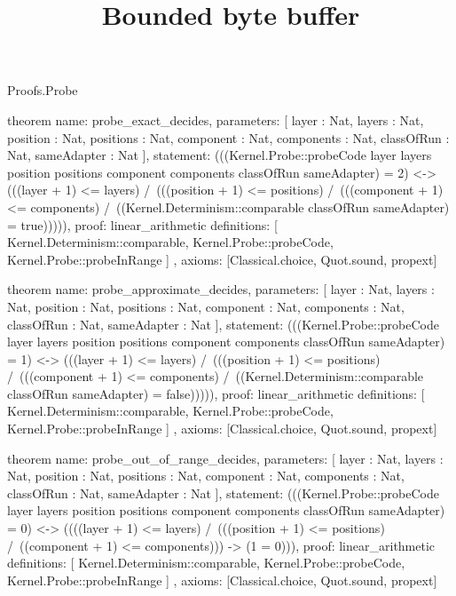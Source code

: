 \begin{lexlean}{Proofs.Probe}
\title{Bounded byte buffer}
\begin{semanticmodule}
theorem{
  name: probe_exact_decides,
  parameters: [
    layer : Nat,
    layers : Nat,
    position : Nat,
    positions : Nat,
    component : Nat,
    components : Nat,
    classOfRun : Nat,
    sameAdapter : Nat
  ],
  statement: (((Kernel.Probe::probeCode layer layers position positions component components classOfRun sameAdapter) = 2) <-> (((layer + 1) <= layers) /\ (((position + 1) <= positions) /\ (((component + 1) <= components) /\ ((Kernel.Determinism::comparable classOfRun sameAdapter) = true))))),
  proof: linear_arithmetic{
    definitions: [
      Kernel.Determinism::comparable,
      Kernel.Probe::probeCode,
      Kernel.Probe::probeInRange
    ]
  },
  axioms: [Classical.choice, Quot.sound, propext]
}

theorem{
  name: probe_approximate_decides,
  parameters: [
    layer : Nat,
    layers : Nat,
    position : Nat,
    positions : Nat,
    component : Nat,
    components : Nat,
    classOfRun : Nat,
    sameAdapter : Nat
  ],
  statement: (((Kernel.Probe::probeCode layer layers position positions component components classOfRun sameAdapter) = 1) <-> (((layer + 1) <= layers) /\ (((position + 1) <= positions) /\ (((component + 1) <= components) /\ ((Kernel.Determinism::comparable classOfRun sameAdapter) = false))))),
  proof: linear_arithmetic{
    definitions: [
      Kernel.Determinism::comparable,
      Kernel.Probe::probeCode,
      Kernel.Probe::probeInRange
    ]
  },
  axioms: [Classical.choice, Quot.sound, propext]
}

theorem{
  name: probe_out_of_range_decides,
  parameters: [
    layer : Nat,
    layers : Nat,
    position : Nat,
    positions : Nat,
    component : Nat,
    components : Nat,
    classOfRun : Nat,
    sameAdapter : Nat
  ],
  statement: (((Kernel.Probe::probeCode layer layers position positions component components classOfRun sameAdapter) = 0) <-> ((((layer + 1) <= layers) /\ (((position + 1) <= positions) /\ ((component + 1) <= components))) -> (1 = 0))),
  proof: linear_arithmetic{
    definitions: [
      Kernel.Determinism::comparable,
      Kernel.Probe::probeCode,
      Kernel.Probe::probeInRange
    ]
  },
  axioms: [Classical.choice, Quot.sound, propext]
}
\end{semanticmodule}
\end{lexlean}
